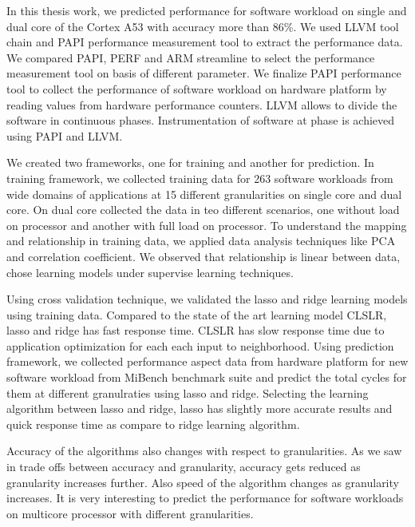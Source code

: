 \setlength{\parindent}{4em}
\setlength{\parskip}{1em}

In this thesis work, we predicted performance for software workload on single and dual core of the Cortex A53 with accuracy more than 86\%. We used LLVM tool chain and PAPI performance measurement tool to extract the performance data. We compared PAPI, PERF and ARM streamline to select the performance measurement tool on basis of different parameter.  We finalize PAPI performance tool to collect the performance of software workload on hardware platform by reading values from hardware performance counters. LLVM allows to divide the software in continuous phases. Instrumentation of software at phase is achieved using PAPI and LLVM. 

\par We created two frameworks, one for training and another for prediction. In training framework, we collected training data for 263 software workloads from wide domains of applications at 15 different granularities on single core and dual core. On dual core collected the data in teo different scenarios, one without load on processor and another with full load on processor.  To understand the mapping and relationship in training data, we applied data analysis techniques like PCA and correlation coefficient. We observed that relationship is linear between data, chose learning models under supervise learning techniques.

\par Using cross validation technique, we validated the lasso and ridge learning models using training data. Compared to the state of the art learning model CLSLR, lasso and ridge has fast response time. CLSLR has slow response time due to application optimization for each each input to neighborhood. Using prediction framework, we collected performance aspect data from hardware platform for new software workload from MiBench benchmark suite and predict the total cycles for them at different granulraties using lasso and ridge. Selecting the learning algorithm between lasso and ridge, lasso has slightly more accurate results and quick response time as compare to ridge learning algorithm. 

\par Accuracy of the algorithms also changes with respect to granularities. As we saw in trade offs between accuracy and granularity, accuracy gets reduced as granularity increases further. Also speed of the algorithm changes as granularity increases. It is very interesting to predict the performance for software workloads on multicore processor with different granularities. 